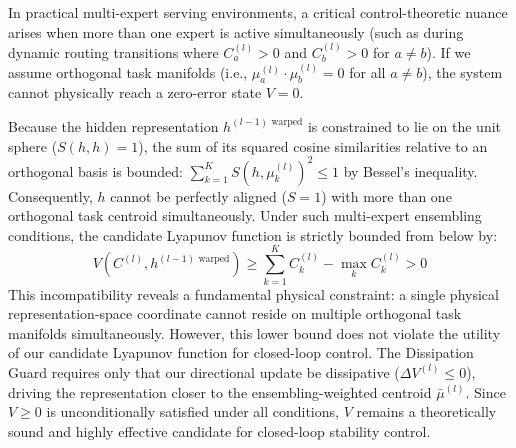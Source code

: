 \begin{remark}
In practical multi-expert serving environments, a critical control-theoretic nuance arises when more than one expert is active simultaneously (such as during dynamic routing transitions where $C_a^{(l)} > 0$ and $C_b^{(l)} > 0$ for $a \ne b$). If we assume orthogonal task manifolds (i.e., $\mu_a^{(l)} \cdot \mu_b^{(l)} = 0$ for all $a \ne b$), the system cannot physically reach a zero-error state $V = 0$.

Because the hidden representation $h^{(l-1) \text{ warped}}$ is constrained to lie on the unit sphere ($S(h, h) = 1$), the sum of its squared cosine similarities relative to an orthogonal basis is bounded: $\sum_{k=1}^K S(h, \mu_k^{(l)})^2 \le 1$ by Bessel's inequality. Consequently, $h$ cannot be perfectly aligned ($S = 1$) with more than one orthogonal task centroid simultaneously. Under such multi-expert ensembling conditions, the candidate Lyapunov function is strictly bounded from below by:
\begin{equation}
V(C^{(l)}, h^{(l-1) \text{ warped}}) \ge \sum_{k=1}^K C_k^{(l)} - \max_{k} C_k^{(l)} > 0
\label{eq:lyapunov_lower_bound}
\end{equation}
This incompatibility reveals a fundamental physical constraint: a single physical representation-space coordinate cannot reside on multiple orthogonal task manifolds simultaneously. However, this lower bound does not violate the utility of our candidate Lyapunov function for closed-loop control. The Dissipation Guard requires only that our directional update be dissipative ($\Delta V^{(l)} \le 0$), driving the representation closer to the ensembling-weighted centroid $\bar{\mu}^{(l)}$. Since $V \ge 0$ is unconditionally satisfied under all conditions, $V$ remains a theoretically sound and highly effective candidate for closed-loop stability control.
\end{remark}

